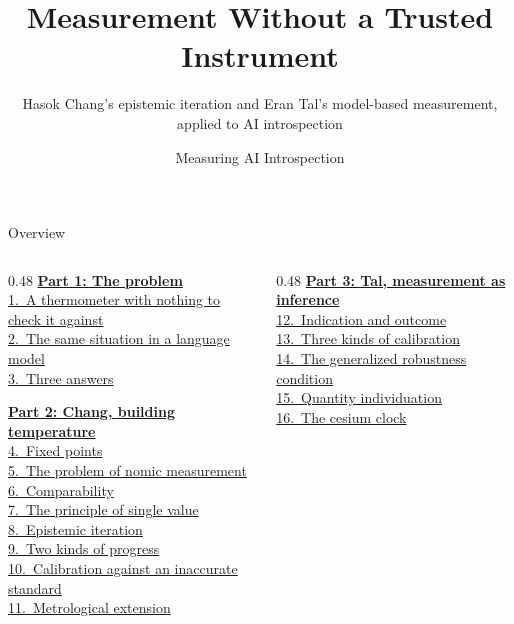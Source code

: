 \documentclass[aspectratio=169,11pt]{beamer}
\title{Measurement Without a Trusted Instrument}
\subtitle{Hasok Chang's epistemic iteration and Eran Tal's model-based measurement, applied to AI introspection}
\author{Measuring AI Introspection}
\date{}
\institute{}
\begin{document}
\begin{frame}[plain]\vspace*{-1.5em}\titlepage\end{frame}

\begin{frame}{Overview}\footnotesize\vspace*{-0.8em}
\begin{columns}[T]
\begin{column}{0.48\textwidth}
\hyperlink{part1}{\textbf{Part 1: The problem}}\\[0.1em]
{\scriptsize%
\quad\hyperlink{nothermo}{1.~A thermometer with nothing to check it against}\\%
\quad\hyperlink{llm}{2.~The same situation in a language model}\\%
\quad\hyperlink{answers}{3.~Three answers}%
}\vspace{0.25em}

\hyperlink{part2}{\textbf{Part 2: Chang, building temperature}}\\[0.1em]
{\scriptsize%
\quad\hyperlink{fixed}{4.~Fixed points}\\%
\quad\hyperlink{nomic}{5.~The problem of nomic measurement}\\%
\quad\hyperlink{compar}{6.~Comparability}\\%
\quad\hyperlink{single}{7.~The principle of single value}\\%
\quad\hyperlink{iter}{8.~Epistemic iteration}\\%
\quad\hyperlink{progress}{9.~Two kinds of progress}\\%
\quad\hyperlink{inaccurate}{10.~Calibration against an inaccurate standard}\\%
\quad\hyperlink{extension}{11.~Metrological extension}%
}
\end{column}
\begin{column}{0.48\textwidth}
\hyperlink{part3}{\textbf{Part 3: Tal, measurement as inference}}\\[0.1em]
{\scriptsize%
\quad\hyperlink{indication}{12.~Indication and outcome}\\%
\quad\hyperlink{calib}{13.~Three kinds of calibration}\\%
\quad\hyperlink{grc}{14.~The generalized robustness condition}\\%
\quad\hyperlink{individ}{15.~Quantity individuation}\\%
\quad\hyperlink{cesium}{16.~The cesium clock}%
}\vspace{0.25em}


\end{column}
\end{columns}
\end{frame}
\end{document}
